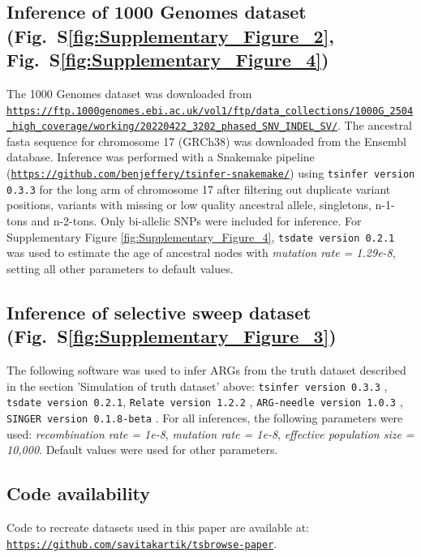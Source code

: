 \documentclass[unnumsec,webpdf,contemporary,large,namedate]{oup-authoring-template}
\begin{document}

\subsection{Inference of 1000 Genomes dataset (Fig.~S\ref{fig:Supplementary_Figure_2}, 
Fig.~S\ref{fig:Supplementary_Figure_4})} The 1000 Genomes dataset was downloaded from
\texttt{\url{https://ftp.1000genomes.ebi.ac.uk/vol1/ftp/data_collections/1000G_2504_high_coverage/working/20220422_3202_phased_SNV_INDEL_SV/}}.
The ancestral fasta sequence for chromosome 17 (GRCh38) was downloaded
from the Ensembl database. Inference was performed with a Snakemake pipeline
(\texttt{\url{https://github.com/benjeffery/tsinfer-snakemake/}}) using
\texttt{tsinfer version 0.3.3} for the long arm of chromosome 17 after
filtering out duplicate variant positions, variants with missing or low quality
ancestral allele, singletons, n-1-tons and n-2-tons. Only bi-allelic SNPs were
included for inference. For Supplementary Figure \ref{fig:Supplementary_Figure_4}, 
\texttt{tsdate version 0.2.1} was used to estimate the age of ancestral nodes
 with \textit{mutation rate = 1.29e-8}, setting all other parameters to default 
 values. 

\subsection{Inference of selective sweep dataset (Fig.~S\ref{fig:Supplementary_Figure_3})} 
The following software was used to infer ARGs from the truth dataset described in the
section 'Simulation of truth dataset' above: 
\texttt{tsinfer version 0.3.3}
\citep{kelleher2019inferring}, \texttt{tsdate version 0.2.1}, 
\texttt{Relate version 1.2.2} \citep{speidel2019method}, 
\texttt{ARG-needle version 1.0.3} \citep{zhang2023biobank},
\texttt{SINGER version 0.1.8-beta} \citep{deng2024robust}.
For all inferences, the following parameters were used: \textit{recombination
    rate = 1e-8}, \textit{mutation rate = 1e-8}, \textit{effective population size
    = 10,000}. Default values were used for other parameters.

\subsection{Code availability} Code to recreate datasets used in this paper are available at:
\texttt{\url{https://github.com/savitakartik/tsbrowse-paper}}.
\end{document}
